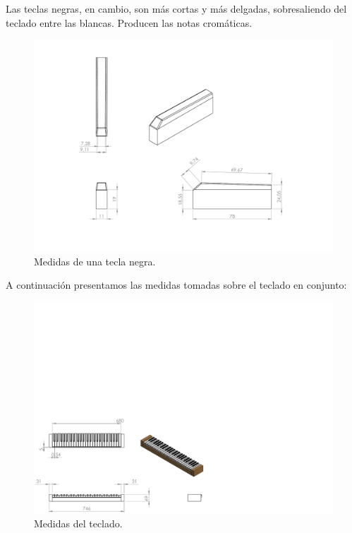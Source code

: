 \smallskip

Las teclas negras, en cambio, son más cortas y más delgadas, sobresaliendo del teclado entre las blancas. Producen las notas cromáticas.

\smallskip

\begin{figure}[H]
	\noindent \begin{centering}
		\includegraphics[clip=true,trim=50 50 50 50, width=\linewidth/2]{capitulo3/negra_modelo}
		\par\end{centering}
	\smallskip
	\caption{\label{fig:negra_modelo} Medidas de una tecla negra.}
\end{figure} 

\smallskip

A continuación presentamos las medidas tomadas sobre el teclado en conjunto:

\smallskip

\begin{figure}[H]
	\noindent \begin{centering}
		\includegraphics[clip=true,trim=0 0 360 320, width=\linewidth*3/4]{capitulo3/teclado_modelo}
		\par\end{centering}
	\smallskip
	\caption{\label{fig:teclado_modelo} Medidas del teclado.}
\end{figure} 

